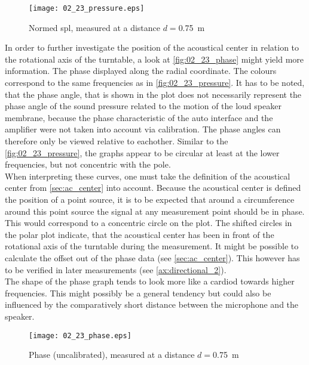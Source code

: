 \begin{figure}[htbp]
	\centering
	\texttt{[image: 02\_23\_pressure.eps]}
	\caption{Normed \gls{spl}, measured at a distance \(d=\)\SI{0.75}{\meter}}
		\label{fig:02_23_pressure}
\end{figure}

In order to further investigate the position of the acoustical center in relation to the rotational axis of the turntable, a look at \autoref{fig:02_23_phase} might yield more information. The phase displayed along the radial coordinate. The colours correspond to the same frequencies as in \autoref{fig:02_23_pressure}. It has to be noted, that the phase angle, that is shown in the plot does not necessarily represent the phase angle of the sound pressure related to the motion of the loud speaker membrane, because the phase characteristic of the auto interface and the amplifier were not taken into account via calibration. The phase angles can therefore only be viewed relative to eachother. Similar to the \autoref{fig:02_23_pressure}, the graphs appear to be circular at least at the lower frequencies, but not concentric with the pole.\\
When interpreting these curves, one must take the definition of the acoustical center from \autoref{sec:ac_center} into account. Because the acoustical center is defined the position of a point source, it is to be expected that around a circumference around this point source the signal at any measurement point should be in phase. This would correspond to a concentric circle on the plot. The shifted circles in the polar plot indicate, that the acoustical center has been in front of the rotational axis of the turntable during the measurement. It might be possible to calculate the offset out of the phase data (see \autoref{sec:ac_center}). This however has to be verified in later measurements (see \autoref{ax:directional_2}).\\
The shape of the phase graph tends to look more like a cardiod towards higher frequencies. This might possibly be a general tendency but could also be influenced by the comparatively short distance between the microphone and the speaker. 

\begin{figure}[htbp]
	\centering
	\texttt{[image: 02\_23\_phase.eps]}
	\caption{Phase (uncalibrated), measured at a distance \(d=\)\SI{0.75}{\meter}}
		\label{fig:02_23_phase}
\end{figure}
